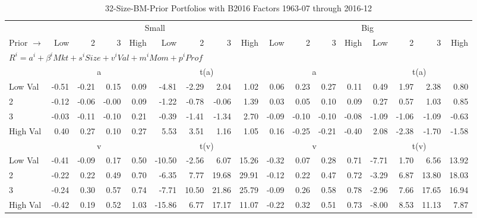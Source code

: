
\begin{table}[!ht]
\centering
\caption{32-Size-BM-Prior Portfolios with B2016 Factors 1963-07 through 2016-12}
\begin{tabular}{lrrrrrrrrrrrrrrrr}
  \toprule
    & \multicolumn{8}{c}{Small} & \multicolumn{8}{c}{Big} \\
      \cmidrule(r){2-9} \cmidrule(r){10-17}
    Prior $\rightarrow$ & Low & 2 & 3 & High & Low & 2 & 3 & High & Low & 2 & 3 & High & Low & 2 & 3 & High \\ 
  \midrule
  \multicolumn{17}{l}{$R^i=a^i+\beta^iMkt+s^iSize+v^iVal+m^iMom+p^iProf$} \\

  
    
      & \multicolumn{4}{c}{a} & \multicolumn{4}{c}{t(a)}
    
      & \multicolumn{4}{c}{a} & \multicolumn{4}{c}{t(a)}
    
    \\
      \cmidrule(r){2-5} \cmidrule(r){6-9} \cmidrule(r){10-13} \cmidrule(r){14-17}

    Low Val   & -0.51  & -0.21  & 0.15  & 0.09  & -4.81  & -2.29  & 2.04  & 1.02  & 0.06  & 0.23  & 0.27  & 0.11  & 0.49  & 1.97  & 2.38  & 0.80  \\
           2  & -0.12  & -0.06  & -0.00  & 0.09  & -1.22  & -0.78  & -0.06  & 1.39  & 0.03  & 0.05  & 0.10  & 0.09  & 0.27  & 0.57  & 1.03  & 0.85  \\
           3  & -0.03  & -0.11  & -0.10  & 0.21  & -0.39  & -1.41  & -1.34  & 2.70  & -0.09  & -0.10  & -0.10  & -0.08  & -1.09  & -1.06  & -1.09  & -0.63  \\
    High Val  & 0.40  & 0.27  & 0.10  & 0.27  & 5.53  & 3.51  & 1.16  & 1.05  & 0.16  & -0.25  & -0.21  & -0.40  & 2.08  & -2.38  & -1.70  & -1.58  \\

  
    
      & \multicolumn{4}{c}{v} & \multicolumn{4}{c}{t(v)}
    
      & \multicolumn{4}{c}{v} & \multicolumn{4}{c}{t(v)}
    
    \\
      \cmidrule(r){2-5} \cmidrule(r){6-9} \cmidrule(r){10-13} \cmidrule(r){14-17}

    Low Val   & -0.41  & -0.09  & 0.17  & 0.50  & -10.50  & -2.56  & 6.07  & 15.26  & -0.32  & 0.07  & 0.28  & 0.71  & -7.71  & 1.70  & 6.56  & 13.92  \\
           2  & -0.22  & 0.22  & 0.49  & 0.70  & -6.35  & 7.77  & 19.68  & 29.91  & -0.12  & 0.22  & 0.47  & 0.72  & -3.29  & 6.87  & 13.80  & 18.03  \\
           3  & -0.24  & 0.30  & 0.57  & 0.74  & -7.71  & 10.50  & 21.86  & 25.79  & -0.09  & 0.26  & 0.58  & 0.78  & -2.96  & 7.66  & 17.65  & 16.94  \\
    High Val  & -0.42  & 0.19  & 0.52  & 1.03  & -15.86  & 6.77  & 17.17  & 11.07  & -0.22  & 0.32  & 0.51  & 0.73  & -8.00  & 8.53  & 11.13  & 7.87  \\


\end{tabular}
\end{table}
